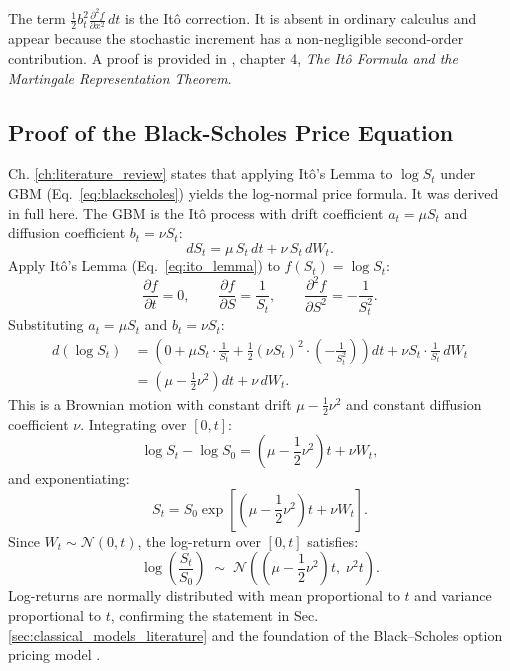 The term $\frac{1}{2} b_t^2 \frac{\partial^2 f}{\partial x^2}\, dt$ is the
It\^{o} correction. It is absent in ordinary calculus and appear
because the stochastic increment has a non-negligible second-order contribution. A proof is provided in \cite{oksendal2003stochastic}, chapter 4, \emph{The Itô Formula and the Martingale Representation Theorem}.

\subsection{Proof of the Black-Scholes Price Equation}

Ch. \ref{ch:literature_review} states that applying It\^{o}'s Lemma to $\log S_t$ under GBM
(Eq.\ \ref{eq:blackscholes}) yields the log-normal price formula. It was derived in full here. The GBM is the It\^{o} process with drift coefficient
$a_t = \mu S_t$ and diffusion coefficient $b_t = \nu S_t$:
\[
    dS_t = \mu\, S_t\, dt + \nu\, S_t\, dW_t.
\]
Apply It\^{o}'s Lemma (Eq.\ \ref{eq:ito_lemma}) to $f(S_t) = \log S_t$:
\[
    \frac{\partial f}{\partial t} = 0, \qquad
    \frac{\partial f}{\partial S} = \frac{1}{S_t}, \qquad
    \frac{\partial^2 f}{\partial S^2} = -\frac{1}{S_t^2}.
\]
Substituting $a_t = \mu S_t$ and $b_t = \nu S_t$:
\begin{align*}
    d(\log S_t)
    &= \left(0 + \mu S_t \cdot \frac{1}{S_t}
       + \frac{1}{2}(\nu S_t)^2 \cdot \left(-\frac{1}{S_t^2}\right)\right)\! dt
       + \nu S_t \cdot \frac{1}{S_t}\, dW_t \\
    &= \left(\mu - \frac{1}{2}\nu^2\right)\! dt + \nu\, dW_t.
\end{align*}
This is a Brownian motion with constant drift $\mu - \frac{1}{2}\nu^2$ and
constant diffusion coefficient $\nu$. Integrating over $[0, t]$:
\[
    \log S_t - \log S_0
    = \left(\mu - \frac{1}{2}\nu^2\right)t + \nu W_t,
\]
and exponentiating:
\[
\label{eq:gbm_solution_app}
    S_t = S_0 \exp\!\left[\left(\mu - \frac{1}{2}\nu^2\right)t
          + \nu W_t\right].
\]
Since $W_t \sim \mathcal{N}(0, t)$, the log-return over $[0, t]$ satisfies:
\[
    \label{eq:lognormal_returns_app}
    \log\!\left(\frac{S_t}{S_0}\right)
    \;\sim\; \mathcal{N}\!\left(\left(\mu - \frac{1}{2}\nu^2\right)t,\;
    \nu^2 t\right).
\]
Log-returns are normally distributed with mean proportional to $t$ and variance
proportional to $t$, confirming the statement in Sec. \ref{sec:classical_models_literature} and the foundation
of the Black--Scholes option pricing model \cite{black1973pricing}.


